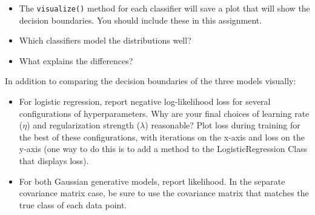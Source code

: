 \documentclass[submit]{harvardml}
\begin{document}
\begin{problem}
\begin{itemize}
\item The \texttt{visualize()} method for each classifier will save a plot that will show the decision boundaries. You should include these in this assignment.
\item Which classifiers model the distributions well?
\item What explains the differences?

\end{itemize}

In addition to comparing the decision boundaries of the three models visually:
\begin{itemize}

\item For logistic regression, report negative log-likelihood loss for several configurations of hyperparameters. Why are your final choices of learning rate ($\eta$) and regularization strength ($\lambda$) reasonable? Plot loss during training for the best of these configurations, with iterations on the x-axis and loss on the y-axis (one way to do this is to add a method to the LogisticRegression Class that displays loss).

\item For both Gaussian generative models, report likelihood. In the separate covariance matrix case, be sure to use the covariance matrix that matches the true class of each data point.

\end{itemize}

\end{problem}
\end{document}
